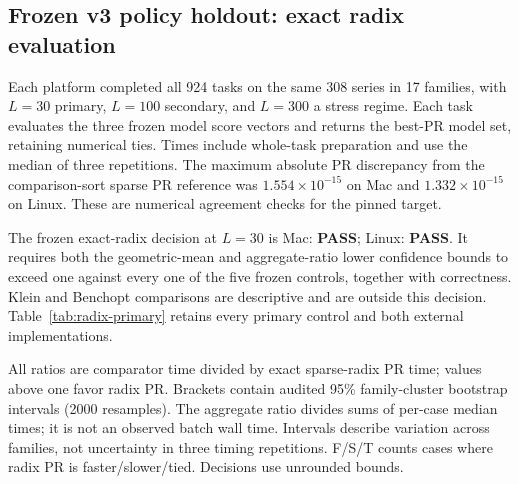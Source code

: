 \subsection{Frozen v3 policy holdout: exact radix evaluation}
\label{sec:pr-engine-results}
Each platform completed all 924 tasks on the same 308 series in 17 families,
with $L=30$ primary, $L=100$ secondary, and $L=300$ a stress regime.
Each task evaluates the three frozen model score vectors and returns the best-PR model set, retaining numerical ties.
Times include whole-task preparation and use the median of three repetitions.
The maximum absolute PR discrepancy from the comparison-sort sparse PR reference was
$1.554\times 10^{-15}$ on Mac and $1.332\times 10^{-15}$ on Linux.
These are numerical agreement checks for the pinned target.

The frozen exact-radix decision at $L=30$ is Mac: \textbf{PASS}; Linux: \textbf{PASS}.
It requires both the geometric-mean and aggregate-ratio lower confidence bounds
to exceed one against every one of the five frozen controls, together with correctness.
Klein and Benchopt comparisons are descriptive and are outside this decision.
Table~\ref{tab:radix-primary} retains every primary control and both external implementations.

All ratios are comparator time divided by exact sparse-radix PR time; values above one favor radix PR.
Brackets contain audited 95\% family-cluster bootstrap intervals (2000 resamples).
The aggregate ratio divides sums of per-case median times; it is not an observed batch wall time.
Intervals describe variation across families, not uncertainty in three timing repetitions.
F/S/T counts cases where radix PR is faster/slower/tied. Decisions use unrounded bounds.

